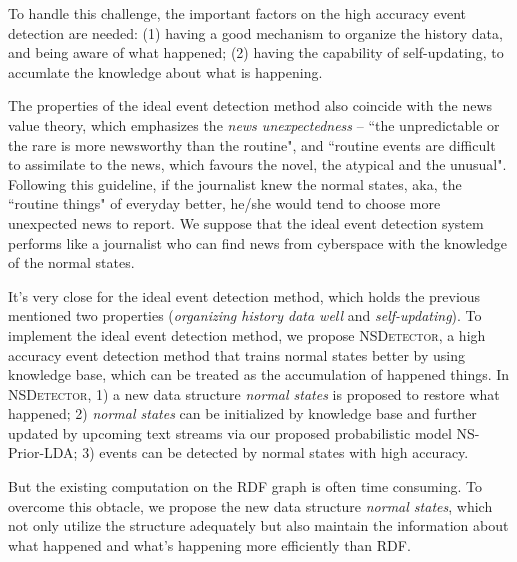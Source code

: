 \documentclass[conference,compsoc]{IEEEtran}
\begin{document}
To handle this challenge, the important factors on the high accuracy event detection are needed: (1) having a good mechanism to organize the history data, and being aware of what happened; (2) having the capability of self-updating, to accumlate the knowledge about what is happening.

The properties of the ideal event detection method also coincide with the news value theory\cite{galtung1965structure}\cite{caple2013delving}, which emphasizes the \textit{news unexpectedness} -- ``the unpredictable or the rare is more newsworthy than the routine"\cite{bell1991language}, and ``routine events are difficult to assimilate to the news, which favours the novel, the atypical and the unusual"\cite{montgomery2007discourse}.
Following this guideline, if the journalist knew the normal states, aka, the ``routine things" of everyday better, he/she would tend to choose more unexpected news to report. 
We suppose that the ideal event detection system performs like a journalist who can find news from cyberspace with the knowledge of the normal states. 

It's very close for the ideal event detection method, which holds the previous mentioned two properties (\textit{organizing history data well} and \textit{self-updating}). To implement the ideal event detection method, we propose \textsc{NSDetector}, a high accuracy event detection method that trains normal states better by using knowledge base, which can be treated as the accumulation of happened things. 
In \textsc{NSDetector}, 1) a new data structure \textit{normal states} is proposed to restore what happened; 2) \textit{normal states} can be initialized by knowledge base and further updated by upcoming text streams via our proposed probabilistic model NS-Prior-LDA; 3) events can be detected by normal states with high accuracy.

But the existing computation on the RDF graph is often time consuming. To overcome this obtacle, we propose the new data structure \textit{normal states}, which not only utilize the structure adequately but also maintain the information about what happened and what's happening more efficiently than RDF.  
\end{document}
